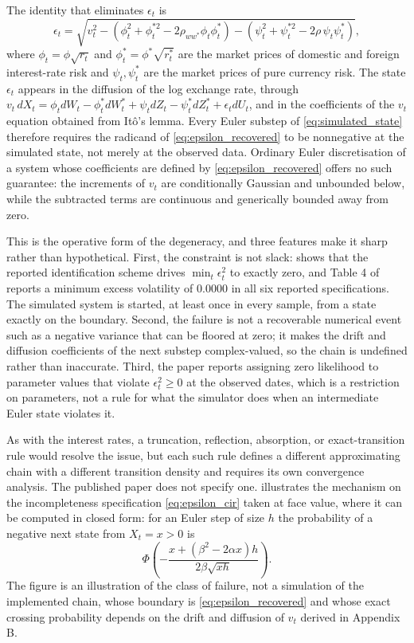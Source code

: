 \documentclass[11pt]{article}
\theoremstyle{definition}
\begin{document}
The identity that eliminates $\epsilon_t$ is
\begin{equation}\label{eq:epsilon_recovered}
\epsilon_t
=\sqrt{
v_t^2
-(\phi_t^2+\phi_t^{*2}-2\rho_{ww^*}\phi_t\phi_t^*)
-(\psi_t^2+\psi_t^{*2}-2\rho\,\psi_t\psi_t^*)
},
\end{equation}
where $\phi_t=\phi\sqrt{r_t}$ and $\phi_t^*=\phi^*\sqrt{r_t^*}$ are the market prices of domestic and foreign interest-rate risk and $\psi_t,\psi_t^*$ are the market prices of pure currency risk. The state $\epsilon_t$ appears in the diffusion of the log exchange rate, through $v_t\,dX_t=\phi_t dW_t-\phi_t^*dW_t^*+\psi_t dZ_t-\psi_t^*dZ_t^*+\epsilon_t dU_t$, and in the coefficients of the $v_t$ equation obtained from It\^o's lemma. Every Euler substep of \eqref{eq:simulated_state} therefore requires the radicand of \eqref{eq:epsilon_recovered} to be nonnegative at the simulated state, not merely at the observed data. Ordinary Euler discretisation of a system whose coefficients are defined by \eqref{eq:epsilon_recovered} offers no such guarantee: the increments of $v_t$ are conditionally Gaussian and unbounded below, while the subtracted terms are continuous and generically bounded away from zero.

This is the operative form of the degeneracy, and three features make it sharp rather than hypothetical. First, the constraint is not slack:  shows that the reported identification scheme drives $\min_t\epsilon_t^2$ to exactly zero, and Table 4 of \citet{BrandtSantaClara2002} reports a minimum excess volatility of $0.0000$ in all six reported specifications. The simulated system is started, at least once in every sample, from a state exactly on the boundary. Second, the failure is not a recoverable numerical event such as a negative variance that can be floored at zero; it makes the drift and diffusion coefficients of the next substep complex-valued, so the chain is undefined rather than inaccurate. Third, the paper reports assigning zero likelihood to parameter values that violate $\epsilon_t^2\ge0$ at the observed dates, which is a restriction on parameters, not a rule for what the simulator does when an intermediate Euler state violates it.

As with the interest rates, a truncation, reflection, absorption, or exact-transition rule would resolve the issue, but each such rule defines a different approximating chain with a different transition density and requires its own convergence analysis. The published paper does not specify one.  illustrates the mechanism on the incompleteness specification \eqref{eq:epsilon_cir} taken at face value, where it can be computed in closed form: for an Euler step of size $h$ the probability of a negative next state from $X_t=x>0$ is
\begin{equation}\label{eq:negative_prob}
\Phi\!\left(
-\frac{x+(\beta^2-2\alpha x)h}{2\beta\sqrt{xh}}
\right).
\end{equation}
The figure is an illustration of the class of failure, not a simulation of the implemented chain, whose boundary is \eqref{eq:epsilon_recovered} and whose exact crossing probability depends on the drift and diffusion of $v_t$ derived in Appendix B.
\end{document}

